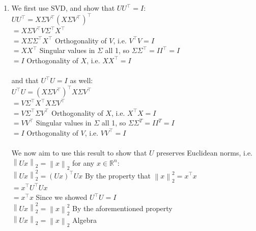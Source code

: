 \documentclass{article}
\newcommand{\field}[1]{\mathbb{#1}}
\newcommand{\1}{\mathbf{1}}
\newcommand{\R}{\field{R}} %
\newcommand{\norm}[1]{\left\|#1\right\|}
\begin{document}
{\begin{enumerate}
  We note that the key difference is that in $\widehat{w}$, our $D$-term is $D^{-1}$, while in $\widehat{w}_{\rm R}$, our $D$-term is $(D^2 + \lambda)^{-1}D$. We can compare this by transforming $D^{-1} = D^{-2}D$. The addition of a positive $\lambda$ term essentially shrinks this parameter and the overall $w$-solutions by increasing the factor by which we are dividing the $D$-term (and therefore overall term as well).

  \item 
  
  We first use SVD, and show that $UU^\top = I$: \\ 
  $UU^\top = X \Sigma V^\top (X \Sigma V^\top)^\top$ \\
  $= X \Sigma V^\top V \Sigma^\top X^\top$ \\
  $= X \Sigma \Sigma^\top X^\top$ \hfill Orthogonality of $V$, i.e. $V^\top V = I$ \\
  $= X X^\top$ \hfill Singular values in $\Sigma$ all 1, so $\Sigma \Sigma^\top = I I^\top = I$ \\
  $= I$ \hfill Orthogonality of $X$, i.e. $X X^\top = I$ \\ \\
  and that $U^\top U = I$ as well: \\
  $U^\top U = (X \Sigma V^\top)^\top X \Sigma V^\top$ \\
  $= V \Sigma^\top X^\top X \Sigma V^\top$ \\
  $= V \Sigma^\top \Sigma V^\top$ \hfill Orthogonality of $X$, i.e. $X^\top X = I$ \\
  $= V V^\top$ \hfill Singular values in $\Sigma$ all 1, so $\Sigma \Sigma^T = I I^T = I$ \\
  $= I$ \hfill Orthogonality of $V$, i.e. $V V^\top = I$ \\ \\

  We now aim to use this result to show that $U$ preserves Euclidean norms, i.e. $\norm{U x}_2 = \norm{x}_2$ for any $x\in \R^n$: \\
  $\norm{U x}^2_2 = (Ux)^\top Ux$ \hfill By the property that $\norm{x}^2_2 = x^\top x$ \\
  $= x^\top U^\top Ux$ \\
  $= x^\top x$ \hfill Since we showed $U^\top U = I$ \\
  $\norm{U x}^2_2 = \norm{x}^2_2$ \hfill By the aforementioned property \\
  $\norm{U x}_2 = \norm{x}_2$ \hfill Algebra

\end{enumerate}

}
\end{document}

